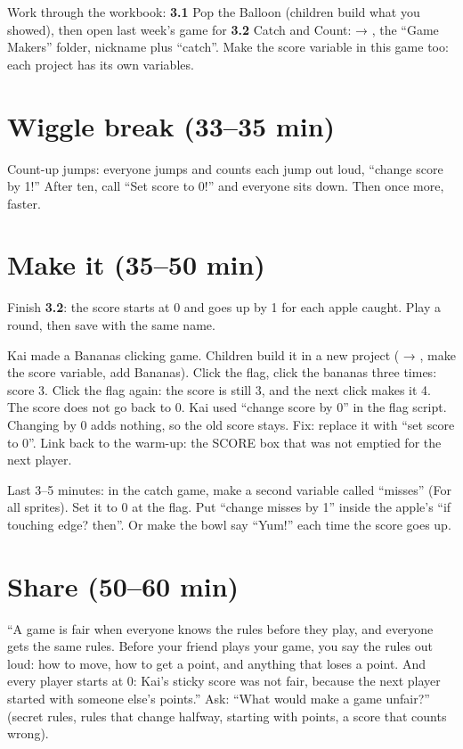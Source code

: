 Work through the workbook: \textbf{3.1} Pop the Balloon (children build what you showed), then open last week's game for \textbf{3.2} Catch and Count:  → , the \enquote{Game Makers} folder, nickname plus \enquote{catch}. Make the score variable in this game too: each project has its own variables.

\section{Wiggle break (33--35 min)}
Count-up jumps: everyone jumps and counts each jump out loud, \enquote{change score by 1!} After ten, call \enquote{Set score to 0!} and everyone sits down. Then once more, faster.

\section{Make it (35--50 min)}
Finish \textbf{3.2}: the score starts at 0 and goes up by 1 for each apple caught. Play a round, then save with the same name.

\begin{bughunt}
Kai made a Bananas clicking game. Children build it in a new project ( → , make the score variable, add Bananas). Click the flag, click the bananas three times: score 3. Click the flag again: the score is still 3, and the next click makes it 4. The score does not go back to 0. Kai used \enquote{change score by 0} in the flag script. Changing by 0 adds nothing, so the old score stays. Fix: replace it with \enquote{set score to 0}. Link back to the warm-up: the SCORE box that was not emptied for the next player.
\end{bughunt}

\begin{freebuild}
Last 3--5 minutes: in the catch game, make a second variable called \enquote{misses} (For all sprites). Set it to 0 at the flag. Put \enquote{change misses by 1} inside the apple's \enquote{if touching edge? then}. Or make the bowl say \enquote{Yum!} each time the score goes up.
\end{freebuild}

\section{Share (50--60 min)}
\begin{safety}
\enquote{A game is fair when everyone knows the rules before they play, and everyone gets the same rules. Before your friend plays your game, you say the rules out loud: how to move, how to get a point, and anything that loses a point. And every player starts at 0: Kai's sticky score was not fair, because the next player started with someone else's points.} Ask: \enquote{What would make a game unfair?} (secret rules, rules that change halfway, starting with points, a score that counts wrong).
\end{safety}


